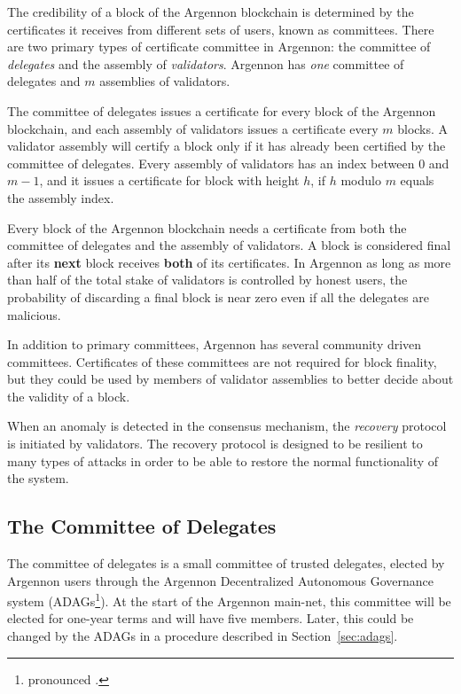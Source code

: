 
The credibility of a block of the Argennon blockchain is determined by the certificates it receives
from different sets of users, known as committees. There are two primary types of certificate committee in
Argennon: the committee of \emph{delegates} and the assembly of \emph{validators}. Argennon has \emph{one} committee
of delegates and $m$ assemblies of validators.

The committee of delegates issues a certificate for every block of the Argennon blockchain, and each
assembly of validators issues a certificate every $m$ blocks. A validator assembly will
certify a block only if it has already been certified by the committee of delegates. Every assembly of validators has
an index between $0$ and $m - 1$, and it issues a certificate for block with height $h$, if $h$ modulo $m$ equals
the assembly index.

Every block of the Argennon blockchain needs a certificate from both the committee of delegates and
the assembly of validators. A block is considered final after its \textbf{next} block receives \textbf{both} of
its certificates. In Argennon as long as more than half of the total stake of validators is controlled by honest users,
the probability of discarding a final block is near zero even if all the delegates are malicious.

In addition to primary committees, Argennon has several community driven committees. Certificates of these
committees are not required for block finality, but they could be used by members of validator assemblies to better
decide about the validity of a block.

When an anomaly is detected in the consensus mechanism, the \emph{recovery} protocol is initiated by validators. The
recovery protocol is designed to be resilient to many types of attacks in order to be able to restore the normal
functionality of the system.

\subsection{The Committee of Delegates}\label{subsec:the-committee-of-delegates}

The committee of delegates is a small committee of trusted delegates, elected by Argennon users through the
Argennon Decentralized Autonomous Governance system (ADAGs\footnote{pronounced .}).
At the start of the Argennon main-net, this committee will be elected for one-year terms and will have five members.
Later, this could be changed by the ADAGs in a procedure described in Section~\ref{sec:adags}.

